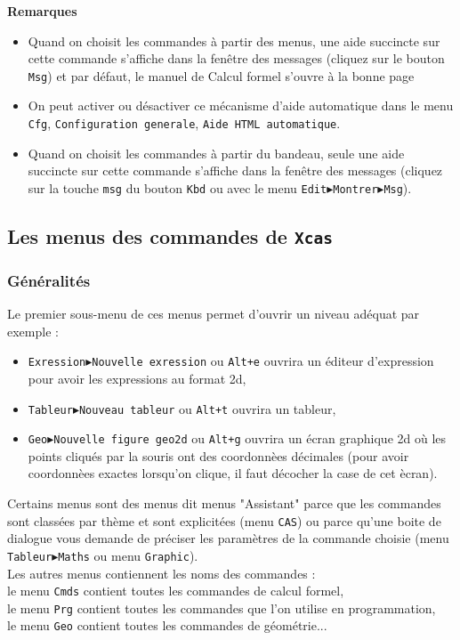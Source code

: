 \documentclass[a4paper,11pt]{article}
\begin{document}
{\bf Remarques} 
\begin{itemize}
\item Quand on choisit les commandes \`a partir des menus,
 une aide succincte sur cette commande
s'affiche dans la fen\^etre des messages (cliquez sur le bouton {\tt Msg}) et 
par d\'efaut, le manuel de Calcul formel s'ouvre \`a la bonne page
\item
On peut activer ou d\'esactiver ce m\'ecanisme d'aide
automatique dans le menu {\tt Cfg}, {\tt Configuration generale},
{\tt Aide HTML automatique}.
\item
Quand on choisit les commandes  \`a partir du bandeau, seule
une aide succincte sur cette commande
s'affiche dans la fen\^etre des messages (cliquez sur la touche {\tt msg} du
bouton {\tt Kbd} ou avec le menu {\tt Edit$\blacktriangleright$Montrer$\blacktriangleright$Msg}). 
\end{itemize}

\subsection{Les menus des commandes de {\tt Xcas}}
\subsubsection{G\'en\'eralit\'es}
Le premier sous-menu de ces menus permet d'ouvrir un niveau ad\'equat 
par exemple :
\begin{itemize}
\item {\tt Exression$\blacktriangleright$Nouvelle exression}  ou {\tt Alt+e} 
ouvrira un \'editeur d'expression pour avoir les expressions au format 2d,
\item {\tt Tableur$\blacktriangleright$Nouveau tableur} ou {\tt Alt+t} ouvrira 
un tableur,
\item {\tt Geo$\blacktriangleright$Nouvelle figure geo2d} ou {\tt Alt+g} ouvrira
un \'ecran graphique 2d o\`u les points cliqu\'es par la souris ont des 
coordonn\`ees d\'ecimales (pour avoir coordonn\`ees exactes lorsqu'on clique, 
il faut d\'ecocher la case \framebox{$\sim$} de cet \`ecran).
\end{itemize}
Certains menus sont des menus dit menus "Assistant" parce que les commandes 
sont class\'ees par th\`eme et sont explicit\'ees (menu {\tt CAS}) ou parce 
qu'une boite de dialogue vous demande de 
pr\'eciser les param\`etres de la commande choisie (menu 
{\tt Tableur$\blacktriangleright$Maths} ou menu {\tt Graphic}).\\
Les autres menus contiennent les noms des commandes :\\ 
le menu {\tt Cmds} contient toutes les commandes de calcul formel,\\ 
le menu {\tt Prg} contient toutes les commandes que l'on utilise en  
programmation,\\
le menu {\tt Geo} contient toutes les commandes de g\'eom\'etrie...
\end{document}
